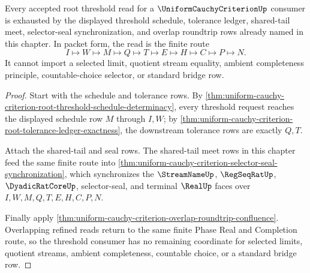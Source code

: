 \begin{theorem}
\label{thm:uniform-cauchy-criterion-root-threshold-exhaustion}
Every accepted root threshold read for a $\UniformCauchyCriterionUp$ consumer is exhausted by the displayed threshold schedule, tolerance ledger, shared-tail meet, selector-seal synchronization, and overlap roundtrip rows already named in this chapter. In packet form, the read is the finite route
$$
I \longmapsto W \longmapsto M \longmapsto Q \longmapsto T \longmapsto E \longmapsto H \longmapsto C \longmapsto P \longmapsto N.
$$
It cannot import a selected limit, quotient stream equality, ambient completeness principle, countable-choice selector, or standard bridge row.
\end{theorem}
\begin{proof}
Start with the schedule and tolerance rows. By \autoref{thm:uniform-cauchy-criterion-root-threshold-schedule-determinacy}, every threshold request reaches the displayed schedule row $M$ through $I,W$; by \autoref{thm:uniform-cauchy-criterion-root-tolerance-ledger-exactness}, the downstream tolerance rows are exactly $Q,T$.

Attach the shared-tail and seal rows. The shared-tail meet rows in this chapter feed the same finite route into \autoref{thm:uniform-cauchy-criterion-selector-seal-synchronization}, which synchronizes the $\StreamNameUp$, $\RegSeqRatUp$, $\DyadicRatCoreUp$, selector-seal, and terminal $\RealUp$ faces over $I,W,M,Q,T,E,H,C,P,N$.

Finally apply \autoref{thm:uniform-cauchy-criterion-overlap-roundtrip-confluence}. Overlapping refined reads return to the same finite Phase Real and Completion route, so the threshold consumer has no remaining coordinate for selected limits, quotient streams, ambient completeness, countable choice, or a standard bridge row.
\end{proof}
